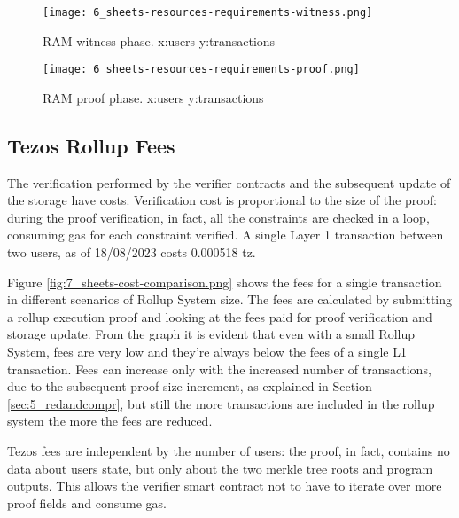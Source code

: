 \begin{figure}
	\centering
	\begin{minipage}{.5\textwidth}
		\centering
		\texttt{[image: 6\_sheets-resources-requirements-witness.png]}
		\caption[RAM Compile]{RAM witness phase. \newline x:users y:transactions}
		\label{fig:7_sheets-resources-requirements-witness.png}
	\end{minipage}%
	\begin{minipage}{.5\textwidth}
		\centering
		\texttt{[image: 6\_sheets-resources-requirements-proof.png]}
		\caption[RAM Proof]{RAM proof phase. \newline x:users y:transactions}
		\label{fig:7_sheets-resources-requirements-proof.png}
	\end{minipage}
\end{figure}

\subsection{Tezos Rollup Fees}

The verification performed by the verifier contracts and the subsequent update of the storage have costs. Verification cost is proportional to the size of the proof: during the proof verification, in fact, all the constraints are checked in a loop, consuming gas for each constraint verified. A single Layer 1 transaction between two users, as of 18/08/2023 costs 0.000518 tz.

Figure \ref{fig:7_sheets-cost-comparison.png} shows the fees for a single transaction in different scenarios of Rollup System size. The fees are calculated by submitting a rollup execution proof and looking at the fees paid for proof verification and storage update. From the graph it is evident that even with a small Rollup System, fees are very low and they're always below the fees of a single L1 transaction. Fees can increase only with the increased number of transactions, due to the subsequent proof size increment, as explained in Section \ref{sec:5_redandcompr}, but still the more transactions are included in the rollup system the more the fees are reduced.

Tezos fees are independent by the number of users: the proof, in fact, contains no data about users state, but only about the two merkle tree roots and program outputs. This allows the verifier smart contract not to have to iterate over more proof fields and consume gas.

